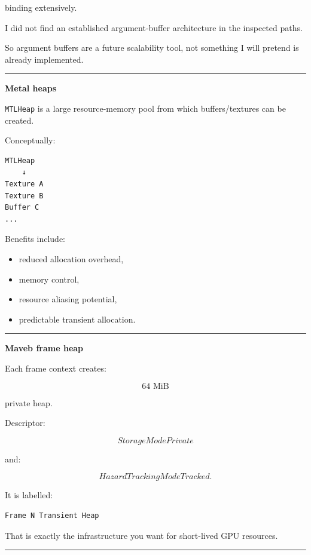 binding extensively.

I did not find an established argument-buffer architecture in the inspected paths.

So argument buffers are a future scalability tool, not something I will pretend is already implemented.

\begin{center}\rule{0.5\linewidth}{0.5pt}\end{center}

\textbf{Metal heaps}

\texttt{MTLHeap} is a large resource-memory pool from which buffers/textures can be created.

Conceptually:

\begin{verbatim}
MTLHeap
    ↓
Texture A
Texture B
Buffer C
...
\end{verbatim}

Benefits include:

\begin{itemize}
\tightlist
\item
  reduced allocation overhead,
\item
  memory control,
\item
  resource aliasing potential,
\item
  predictable transient allocation.
\end{itemize}

\begin{center}\rule{0.5\linewidth}{0.5pt}\end{center}

\textbf{Maveb frame heap}

Each frame context creates:

\[
64\text{ MiB}
\]

private heap.

Descriptor:

\[
StorageModePrivate
\]

and:

\[
HazardTrackingModeTracked.
\]

It is labelled:

\begin{verbatim}
Frame N Transient Heap
\end{verbatim}

That is exactly the infrastructure you want for short-lived GPU resources.

\begin{center}\rule{0.5\linewidth}{0.5pt}\end{center}


